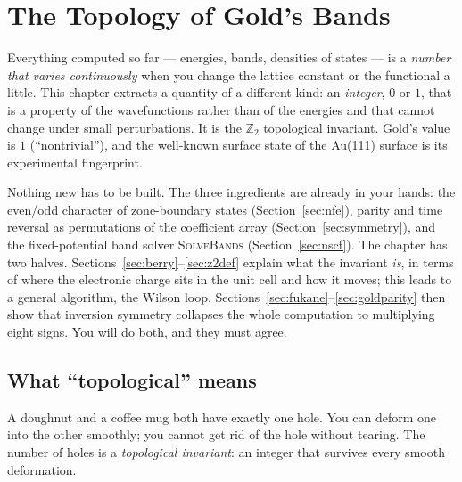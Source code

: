 \chapter{The Topology of Gold's Bands}
\label{ch:topology}

Everything computed so far --- energies, bands, densities of states --- is a
\emph{number that varies continuously} when you change the lattice constant
or the functional a little. This chapter extracts a quantity of a different
kind: an \emph{integer}, $0$ or $1$, that is a property of the
wavefunctions rather than of the energies and that cannot change under
small perturbations. It is the $\mathbb{Z}_2$ topological invariant.
Gold's value is $1$ (``nontrivial''), and the well-known surface state of
the Au(111) surface is its experimental fingerprint.

Nothing new has to be built. The three ingredients are already in your
hands: the even/odd character of zone-boundary states
(Section~\ref{sec:nfe}), parity and time reversal as permutations of the
coefficient array (Section~\ref{sec:symmetry}), and the fixed-potential
band solver \textsc{SolveBands} (Section~\ref{sec:nscf}). The chapter
has two halves. Sections~\ref{sec:berry}--\ref{sec:z2def} explain what the
invariant \emph{is}, in terms of where the electronic charge sits in the
unit cell and how it moves; this leads to a general algorithm, the Wilson
loop. Sections~\ref{sec:fukane}--\ref{sec:goldparity} then show that
inversion symmetry collapses the whole computation to multiplying eight
signs. You will do both, and they must agree.

\section{What ``topological'' means}

A doughnut and a coffee mug both have exactly one hole. You can deform one
into the other smoothly; you cannot get rid of the hole without tearing.
The number of holes is a \emph{topological invariant}: an integer that
survives every smooth deformation.

